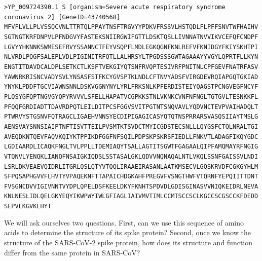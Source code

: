 \texttt{>YP\_009724390.1 S [organism=Severe acute respiratory syndrome coronavirus 2] [GeneID=43740568] \\
	MFVFLVLLPLVSSQCVNLTTRTQLPPAYTNSFTRGVYYPDKVFRSSVLHSTQDLFLPFFSNVTWFHAIHV \\
	SGTNGTKRFDNPVLPFNDGVYFASTEKSNIIRGWIFGTTLDSKTQSLLIVNNATNVVIKVCEFQFCNDPF \\
	LGVYYHKNNKSWMESEFRVYSSANNCTFEYVSQPFLMDLEGKQGNFKNLREFVFKNIDGYFKIYSKHTPI \\
	NLVRDLPQGFSALEPLVDLPIGINITRFQTLLALHRSYLTPGDSSSGWTAGAAAYYVGYLQPRTFLLKYN \\
	ENGTITDAVDCALDPLSETKCTLKSFTVEKGIYQTSNFRVQPTESIVRFPNITNLCPFGEVFNATRFASV \\
	YAWNRKRISNCVADYSVLYNSASFSTFKCYGVSPTKLNDLCFTNVYADSFVIRGDEVRQIAPGQTGKIAD \\
	YNYKLPDDFTGCVIAWNSNNLDSKVGGNYNYLYRLFRKSNLKPFERDISTEIYQAGSTPCNGVEGFNCYF \\
	PLQSYGFQPTNGVGYQPYRVVVLSFELLHAPATVCGPKKSTNLVKNKCVNFNFNGLTGTGVLTESNKKFL \\
	PFQQFGRDIADTTDAVRDPQTLEILDITPCSFGGVSVITPGTNTSNQVAVLYQDVNCTEVPVAIHADQLT \\
	PTWRVYSTGSNVFQTRAGCLIGAEHVNNSYECDIPIGAGICASYQTQTNSPRRARSVASQSIIAYTMSLG \\
	AENSVAYSNNSIAIPTNFTISVTTEILPVSMTKTSVDCTMYICGDSTECSNLLLQYGSFCTQLNRALTGI \\
	AVEQDKNTQEVFAQVKQIYKTPPIKDFGGFNFSQILPDPSKPSKRSFIEDLLFNKVTLADAGFIKQYGDC \\
	LGDIAARDLICAQKFNGLTVLPPLLTDEMIAQYTSALLAGTITSGWTFGAGAALQIPFAMQMAYRFNGIG \\
	VTQNVLYENQKLIANQFNSAIGKIQDSLSSTASALGKLQDVVNQNAQALNTLVKQLSSNFGAISSVLNDI \\
	LSRLDKVEAEVQIDRLITGRLQSLQTYVTQQLIRAAEIRASANLAATKMSECVLGQSKRVDFCGKGYHLM \\
	SFPQSAPHGVVFLHVTYVPAQEKNFTTAPAICHDGKAHFPREGVFVSNGTHWFVTQRNFYEPQIITTDNT \\
	FVSGNCDVVIGIVNNTVYDPLQPELDSFKEELDKYFKNHTSPDVDLGDISGINASVVNIQKEIDRLNEVA \\
	KNLNESLIDLQELGKYEQYIKWPWYIWLGFIAGLIAIVMVTIMLCCMTSCCSCLKGCCSCGSCCKFDEDD \\
	SEPVLKGVKLHYT \\
}

We will ask ourselves two questions. First, can we use this sequence of amino acids to determine the structure of its spike protein? Second, once we know the structure of the SARS-CoV-2 spike protein, how does its structure and function differ from the same protein in SARS-CoV?

